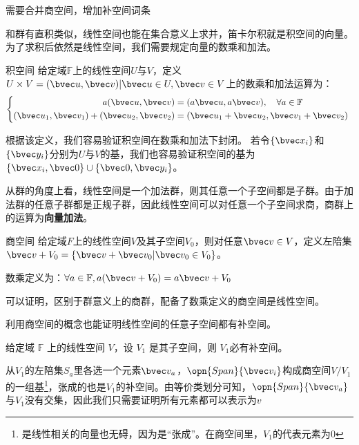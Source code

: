 

\begin{issues}
\issueDraft 
需要合并商空间，增加补空间词条
\end{issues}
和群有直积类似，线性空间也能在集合意义上求并，笛卡尔积就是积空间的向量。为了求积后依然是线性空间，我们需要规定向量的数乘和加法。

\begin{definition}{积空间}
给定域$\mathbb F $上的线性空间$U$与$V$，定义$U\times V={(\bvec u,\bvec v)|\bvec u\in U,\bvec v\in V}$上的数乘和加法运算为：
\begin{equation}
\left\{\begin{aligned}
a(\bvec u,\bvec v)&=(a\bvec u,a\bvec v),\quad \forall a\in \mathbb F\\
(\bvec u_1,\bvec v_1)+(\bvec u_2,\bvec v_2)&=(\bvec u_1+\bvec u_2,\bvec v_1+\bvec v_2)
\end{aligned}\right.~
\end{equation}
\end{definition}
根据该定义，我们容易验证积空间在数乘和加法下封闭。
若令$\{\bvec x_i\}$和$\{\bvec y_i\}$分别为$U$与$V$的基，我们也容易验证积空间的基为$\{\bvec x_i,\bvec 0\}\cup \{\bvec 0,\bvec y_i\}$。

从群的角度上看，线性空间是一个加法群，则其任意一个子空间都是子群。由于加法群的任意子群都是正规子群，因此线性空间可以对任意一个子空间求商，商群上的运算为\textbf{向量加法}。
\begin{definition}{商空间}
给定域$F$上的线性空间$V$及其子空间$V_0$，则对任意$\bvec v\in V$，定义左陪集$\bvec v+V_0=\{\bvec v+\bvec v_0|\bvec v_0\in V_0\}$。

数乘定义为：$\forall a\in \mathbb F,a(\bvec v+V_0)=a\bvec v+V_0$
\end{definition}
可以证明，区别于群意义上的商群，配备了数乘定义的商空间是线性空间。

利用商空间的概念也能证明线性空间的任意子空间都有补空间。
\begin{theorem}{}
给定域 $\mathbb F$ 上的线性空间 $V$，设 $V_1$ 是其子空间，则 $V_1$必有补空间。
\end{theorem}
从$V_1$的左陪集${S_a}$里各选一个元素$\bvec v_a$，$\opn{Span} \{\bvec v_i\}$构成商空间$V/V_1$的一组基\footnote{是线性相关的向量也无碍，因为是“张成”。在商空间里，$V_1$的代表元素为$0$}，张成的也是$V_1$的补空间。由等价类划分可知，$\opn{Span} \{\bvec v_a\}$与$V_1$没有交集，因此我们只需要证明所有元素都可以表示为$v$